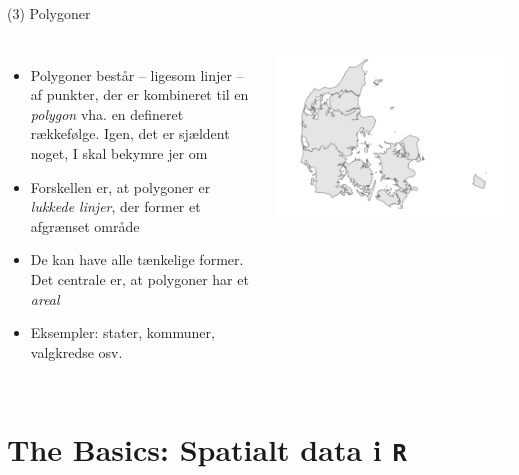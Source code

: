 \documentclass[
  8pt,
  ignorenonframetext,
  aspectratio=169]{beamer}
\newcommand{\columnsbegin}{\begin{columns}}
\newcommand{\columnsend}{\end{columns}}
\begin{document}
\begin{frame}{(3) Polygoner}
\protect\hypertarget{polygoner}{}
\columnsbegin
{}

\begin{itemize}
\item
  Polygoner består -- ligesom linjer -- af punkter, der er kombineret
  til en \emph{polygon} vha. en defineret rækkefølge. Igen, det er
  sjældent noget, I skal bekymre jer om
\item
  Forskellen er, at polygoner er \emph{lukkede linjer}, der former et
  afgrænset område
\item
  De kan have alle tænkelige former. Det centrale er, at polygoner har
  et \emph{areal}
\item
  Eksempler: stater, kommuner, valgkredse osv.
\end{itemize}


\tiny

\includegraphics[width=1\linewidth]{crashcourse_slides_files/figure-beamer/unnamed-chunk-7-1}

\normalsize

\columnsend
\end{frame}

\hypertarget{the-basics-spatialt-data-i-r}{%
\section{\texorpdfstring{The Basics: Spatialt data i
\texttt{R}}{The Basics: Spatialt data i R}}\label{the-basics-spatialt-data-i-r}}
\end{document}
